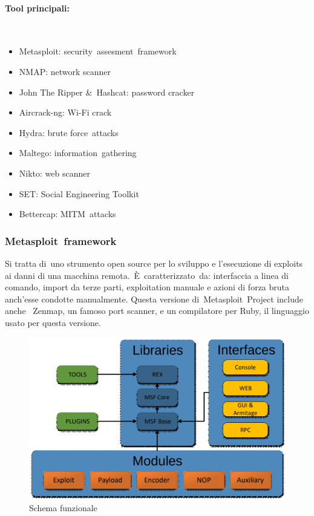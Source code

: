 \documentclass{article}
\begin{document}
\paragraph{Tool principali:} 
\begin{itemize}
    \item Metasploit: security assesment framework
    \item NMAP: network scanner 
    \item John The Ripper \& Hashcat: password cracker
    \item Aircrack-ng: Wi-Fi crack
    \item Hydra: brute force attacks
    \item Maltego: information gathering
    \item Nikto: web scanner
    \item SET: Social Engineering Toolkit
    \item Bettercap: MITM attacks 
\end{itemize}
\subsubsection{Metasploit framework}
Si tratta di uno strumento open source per lo sviluppo e l'esecuzione di exploits ai danni di una macchina 
remota. È caratterizzato da: interfaccia a linea di comando, import da terze parti, exploitation manuale e 
azioni di forza bruta anch’esse condotte manualmente. Questa versione di Metasploit Project include anche 
Zenmap, un famoso port scanner, e un compilatore per Ruby, il linguaggio usato per questa versione. 
\begin{figure}[H]
    \center
    \includegraphics[scale=0.3]{images/SchemaMetasploit.png}
    \caption{Schema funzionale}\label{fig:1}
\end{figure}
\end{document}
